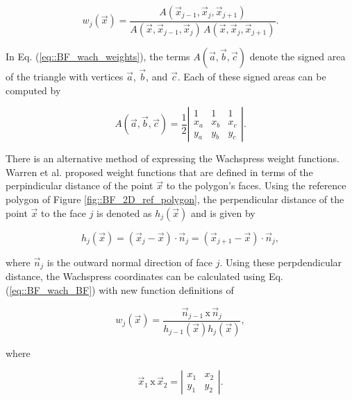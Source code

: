 \begin{equation}
\label{eq::BF_wach_weights}
w_j (\vec{x})  = \frac{A(\vec{x}_{j-1}, \vec{x}_{j}, \vec{x}_{j+1})}{A(\vec{x}, \vec{x}_{j-1}, \vec{x}_{j}) \, A(\vec{x}, \vec{x}_{j}, \vec{x}_{j+1})} .
\end{equation}

\noindent In Eq. (\ref{eq::BF_wach_weights}), the terms $A(\vec{a}, \vec{b}, \vec{c})$ denote the signed area of the triangle with vertices $\vec{a}$, $\vec{b}$, and $\vec{c}$. Each of these signed areas can be computed by

\begin{equation}
\label{eq::BF_wach_signed_area}
A(\vec{a}, \vec{b}, \vec{c}) = \frac{1}{2}
\left|  
  \begin{array}{ccc}
  1 & 1 & 1 \\
  x_a & x_b & x_c \\
  y_a & y_b & y_c
  \end{array}
\right| .
\end{equation}

There is an alternative method of expressing the Wachspress weight functions. Warren et al. \cite{warren2007barycentric} proposed weight functions that are defined in terms of the perpindicular distance of the point $\vec{x}$ to the polygon's faces. Using the reference polygon of Figure \ref{fig::BF_2D_ref_polygon}, the perpendicular distance of the point $\vec{x}$ to the face $j$ is denoted as $h_j (\vec{x})$ and is given by

\begin{equation}
\label{eq::BF_wach_perp_dist}
h_j (\vec{x}) = \left(  \vec{x}_j - \vec{x} \right) \cdot \vec{n}_j = \left(  \vec{x}_{j+1} - \vec{x} \right) \cdot \vec{n}_j , 
\end{equation}

\noindent where $\vec{n}_j$ is the outward normal direction of face $j$. Using these perpdendicular distance, the Wachspress coordinates can be calculated using Eq. (\ref{eq::BF_wach_BF}) with new function definitions of

\begin{equation}
\label{eq::BF_wach_wt_perpdist}
 w_j (\vec{x}) = \frac{\vec{n}_{j-1} \, \text{x} \, \vec{n}_j}{h_{j-1} (\vec{x}) h_j (\vec{x})} ,
\end{equation}

\noindent where

\begin{equation}
\label{eq::BF_wach_cross}
\vec{x}_{1} \, \text{x} \, \vec{x}_2 = 
\left|  
\begin{array}{ccc}
x_1 & x_2 \\
y_1 & y_2
\end{array}
\right| .
\end{equation}

